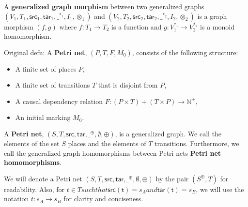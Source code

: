 \begin{definition}
  \label{Petri-net-morphism}
  A \textbf{generalized graph morphism} between two generalized graphs\\
  $(V_1, T_1, \mathsf{src_1}, \mathsf{tar_1}, \_^{*_1},I_1,\otimes_1)$ and
  $(V_2, T_2, \mathsf{src_2}, \mathsf{tar_2}, \_^{*_2},I_2,\otimes_2)$ is a graph morphism
  $(f, g)$ where $f : T_1 \to T_2$ is a function and
  $g: V_1^{*_1} \to V_2^{*_2}$ is a monoid homomorphism.
\end{definition}

\begin{definition}
  \label{def:Original-Petri-Net}
  Original defn: A \textbf{Petri net}, $(P, T, F, M_0)$, consists of the following structure:  
  \begin{itemize}
  \item A finite set of places $P$,
  \item A finite set of transitions $T$ that is disjoint from $P$,
  \item A causal dependency relation $F: (P \times T) + (T \times P) \to \mathbb{N}^+ $, 
  \item An initial marking $M_0$.
  \end{itemize}
\end{definition}
%
\begin{definition}
  \label{def:Petri-Net}
  A \textbf{Petri net}, $(S, T, \mathsf{src},
  \mathsf{tar},\_^{\oplus},\emptyset,\oplus)$, is a generalized graph.  We call
  the elements of the set $S$ places and the elements of $T$
  transitions.  Furthermore, we call the generalized graph
  homomorphisms between Petri nets \textbf{Petri net homomorphisms}.
\end{definition}
We will denote a Petri net $(S, T, \mathsf{src},
\mathsf{tar},\_^{\oplus},\emptyset,\oplus)$ by the pair $(S^\oplus,T)$ for
readability. Also, for $t \in T such that \mathsf{src(t)} = s_A and \mathsf{tar(t)} = s_B$, we will use the notation $t : s_A \rightarrow s_B$ for clarity and conciseness. 
%
